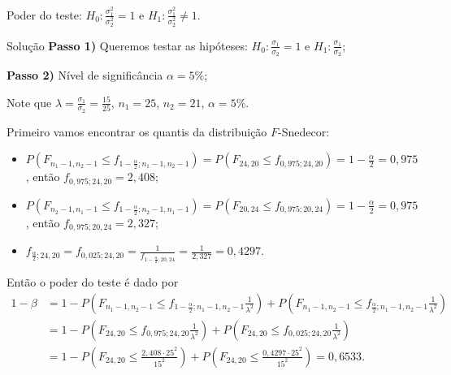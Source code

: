 \documentclass[9pt]{beamer}
\begin{document}
\begin{frame}{Poder do teste: $H_0:\frac{\sigma_1^2}{\sigma_2^2} = 1$ e $H_1:\frac{\sigma_1^2}{\sigma_2^2} \neq 1$.}

\footnotesize

\begin{block}{Solução}
	\textbf{Passo 1)} Queremos testar as hipóteses: $H_0: \frac{\sigma_1}{\sigma_2} = 1$ e $H_1: \frac{\sigma_1}{\sigma_2}$;
	
	\textbf{Passo 2)} Nível de significância $\alpha=5\%$;
	
	Note que $\lambda = \frac{\sigma_1}{\sigma_2} = \frac{15}{25}$, $n_1=25$, $n_2=21$, $\alpha=5\%$.
	
	Primeiro vamos encontrar os quantis da distribuição $F$-Snedecor:
	\begin{itemize}
		\item $P\left(F_{n_1-1, n_2-1} \leq f_{1-\frac{\alpha}{2}; n_1-1, n_2-1} \right) = P\left(F_{24, 20} \leq f_{0,975; 24, 20} \right) =1- \frac{\alpha}{2} = 0,975$, então $f_{0,975; 24, 20} = 2,408$;
		\item $P\left(F_{n_2-1, n_1-1} \leq f_{1-\frac{\alpha}{2}; n_2-1, n_1-1} \right) = P\left(F_{20, 24} \leq f_{0,975; 20, 24} \right) =1- \frac{\alpha}{2} = 0,975$, então $f_{0,975; 20, 24} = 2,327$;
		\item $f_{\frac{\alpha}{2}; 24, 20} = f_{0,025; 24, 20} =  \frac{1}{f_{1-\frac{\alpha}{2};20, 24}} = \frac{1}{2,327}=0,4297$.
	\end{itemize}

	Então o poder do teste é dado por
	\begin{align*}
		1-\beta &= 1 - P\left( F_{n_1-1, n_2-1} \leq f_{1-\frac{\alpha}{2};n_1-1, n_2-1} \frac{1}{\lambda^2} \right) + P\left( F_{n_1-1, n_2-1} \leq f_{\frac{\alpha}{2};n_1-1, n_2-1} \frac{1}{\lambda^2} \right)\\
		&=1 - P\left( F_{24, 20} \leq f_{0,975;24, 20} \frac{1}{\lambda^2} \right) + P\left( F_{24, 20} \leq f_{0,025;24, 20} \frac{1}{\lambda^2} \right)\\
		&= 1 - P\left( F_{24, 20} \leq \frac{2,408 \cdot 25^2}{15^2} \right) + P\left( F_{24, 20} \leq \frac{0,4297 \cdot 25^2}{15^2} \right) = 0,6533.
	\end{align*}
\end{block}

\normalsize
\end{frame}
\end{document}
